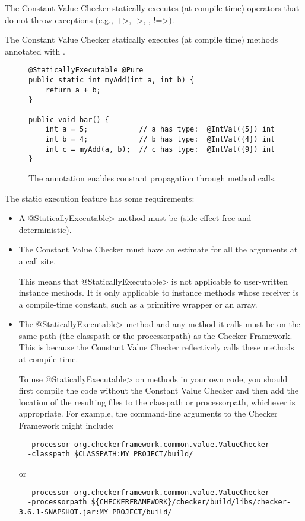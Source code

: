 The Constant Value Checker statically executes (at compile time) operators that do
not throw exceptions (e.g., \<+>, \<->, \code{<}\code{<}, \<!=>).



The Constant Value Checker statically executes (at compile time) methods annotated with
.

\begin{figure}
\begin{Verbatim}
@StaticallyExecutable @Pure
public static int myAdd(int a, int b) {
    return a + b;
}

public void bar() {
    int a = 5;            // a has type:  @IntVal({5}) int
    int b = 4;            // b has type:  @IntVal({4}) int
    int c = myAdd(a, b);  // c has type:  @IntVal({9}) int
}
\end{Verbatim}
\caption{The
   annotation enables
  constant propagation through method calls.}
\label{fig-staticallyexecutable}
\end{figure}

The static execution feature has some requirements:

\begin{itemize}
\item
  A \<@StaticallyExecutable> method must be
   (side-effect-free and deterministic).

\item
  The Constant Value Checker must have an estimate for all the arguments at
  a call site.

  This means that \<@StaticallyExecutable> is not applicable
  to user-written instance methods.  It is only applicable to instance
  methods whose receiver is a compile-time constant, such as a primitive
  wrapper or an array.

\item
  The \<@StaticallyExecutable> method and any method it calls must be on
  the same path (the classpath or the processorpath) as the Checker
  Framework.  This is because the Constant Value Checker reflectively calls
  these methods at compile time.

To use \<@StaticallyExecutable> on methods in your own code, you should
first compile the code without the Constant Value Checker and then add
the location of the resulting  files to the
classpath or processorpath, whichever is appropriate. For example, the
command-line arguments to the Checker Framework
might include:
\begin{Verbatim}
  -processor org.checkerframework.common.value.ValueChecker
  -classpath $CLASSPATH:MY_PROJECT/build/
\end{Verbatim}
or
\begin{Verbatim}
  -processor org.checkerframework.common.value.ValueChecker
  -processorpath ${CHECKERFRAMEWORK}/checker/build/libs/checker-3.6.1-SNAPSHOT.jar:MY_PROJECT/build/
\end{Verbatim}

\end{itemize}


